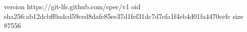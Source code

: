 version https://git-lfs.github.com/spec/v1
oid sha256:ab12dcbff0adcd59ced8dafe85ee37d1fef31dc7d7efa1f4eb4d01fa4470cefc
size 87556

